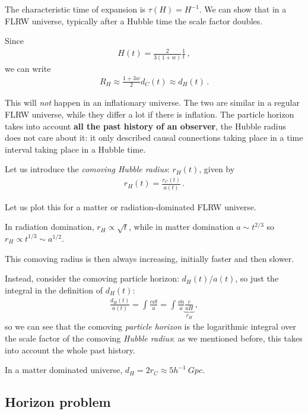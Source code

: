 \documentclass[main.tex]{subfiles}
\begin{document}
The characteristic time of expansion is \(\tau (H ) =H^{-1}\). 
We can show that in a FLRW universe, typically after a Hubble time the scale factor doubles. 

Since 
%
\begin{align}
H(t) = \frac{2}{3 (1+w)} \frac{1}{t} 
\,,
\end{align}
%
we can write
%
\begin{align}
R_H \approx \frac{1 + 3w}{2} d_C (t) \approx d_H (t)
\,.
\end{align}


This will \emph{not} happen in an inflationary universe.
The two are similar in a regular FLRW universe, while they differ a lot if there is inflation. 
The particle horizon takes into account \textbf{all the past history of an observer}, the Hubble radius does not care about it: it only described causal connections taking place in a time interval taking place in a Hubble time. 

Let us introduce the \emph{comoving Hubble radius}: \(r_H (t)\), given by 
%
\begin{align}
r_H (t) = \frac{r_C (t)}{a(t)}
\,.
\end{align}

Let us plot this for a matter or radiation-dominated FLRW universe.

In radiation domination, \(r_H \propto \sqrt{t}\), while in matter domination \(a \sim t^{2/3}\) so \(r_H \propto t^{1/3} \sim a^{1/2}\). 

This comoving radius is then always increasing, initially faster and then slower. 

Instead, consider the comoving particle horizon: \(d_H (t) / a(t)\), so just the integral in the definition of \(d_H(t)\): 
%
\begin{align}
\frac{d_H (t)}{a(t)} = \int \frac{c \dd{t}}{a} = \int \frac{ \dd{a}}{a} \underbrace{\frac{c}{a H}}_{r_H}
\,,
\end{align}
%
so we can see that the comoving \emph{particle horizon} is the logarithmic integral over the scale factor of the comoving \emph{Hubble radius}: as we mentioned before, this takes into account the whole past history. 

In a matter dominated universe, \(d_H = 2 r_C \approx 5 h^{-1} \SI{}{Gpc}\).

\subsection{Horizon problem}
\end{document}

